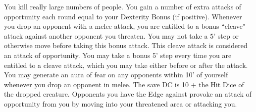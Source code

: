 {You kill really large numbers of people.}
{You gain a number of extra attacks of opportunity each round equal to your Dexterity Bonus (if positive).}
{Whenever you drop an opponent with a melee attack, you are entitled to a bonus ``cleave" attack against another opponent you threaten. You may not take a 5' step or otherwise move before taking this bonus attack. This cleave attack is considered an attack of opportunity.}
{You may take a bonus 5' step every time you are entitled to a cleave attack, which you may take either before or after the attack.}
{You may generate an aura of fear on any opponents within 10' of yourself whenever you drop an opponent in melee. The save DC is 10 + the Hit Dice of the dropped creature.}
{Opponents you have the Edge against provoke an attack of opportunity from you by moving into your threatened area or attacking you.}